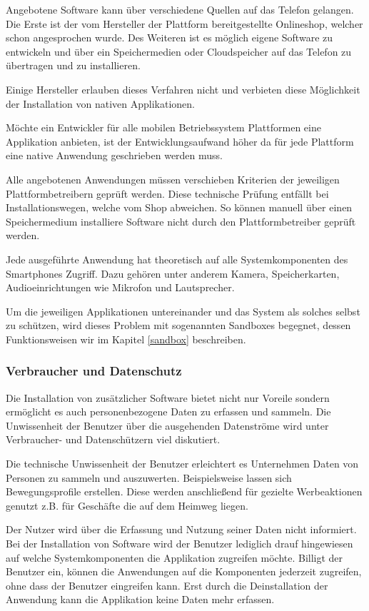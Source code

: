 Angebotene Software kann über verschiedene Quellen auf das Telefon gelangen. Die Erste ist der vom Hersteller der Plattform bereitgestellte Onlineshop, welcher schon angesprochen wurde. Des Weiteren ist es möglich eigene Software zu entwickeln und über ein Speichermedien oder Cloudspeicher auf das Telefon zu übertragen und zu installieren.

Einige Hersteller erlauben dieses Verfahren nicht und verbieten diese Möglichkeit der Installation von nativen Applikationen.

Möchte ein Entwickler für alle mobilen Betriebssystem Plattformen eine Applikation anbieten, ist der Entwicklungsaufwand höher da für jede Plattform eine native Anwendung geschrieben werden muss.

Alle angebotenen Anwendungen müssen verschieben Kriterien der jeweiligen Plattformbetreibern geprüft werden. Diese technische Prüfung entfällt bei Installationswegen, welche vom Shop abweichen. So können manuell über einen Speichermedium installiere Software nicht durch den Plattformbetreiber geprüft werden.

Jede ausgeführte Anwendung hat theoretisch auf alle Systemkomponenten des Smartphones Zugriff. Dazu gehören unter anderem Kamera, Speicherkarten, Audioeinrichtungen wie Mikrofon und Lautsprecher.

Um die jeweiligen Applikationen untereinander und das System als solches selbst zu schützen, wird dieses Problem mit sogenannten Sandboxes begegnet, dessen Funktionsweisen wir im Kapitel \ref{sandbox} beschreiben.

\subsubsection{Verbraucher und Datenschutz}
Die Installation von zusätzlicher Software bietet nicht nur Voreile sondern ermöglicht es auch personenbezogene Daten zu erfassen und sammeln. Die Unwissenheit der Benutzer über die ausgehenden Datenströme wird unter Verbraucher- und Datenschützern viel diskutiert.

Die technische Unwissenheit der Benutzer erleichtert es Unternehmen Daten von Personen zu sammeln und auszuwerten. Beispielsweise lassen sich Bewegungsprofile erstellen. Diese werden anschließend für gezielte Werbeaktionen genutzt z.B. für Geschäfte die auf dem Heimweg liegen.

Der Nutzer wird über die Erfassung und Nutzung seiner Daten nicht informiert. Bei der Installation von Software wird der Benutzer lediglich drauf hingewiesen auf welche Systemkomponenten die Applikation zugreifen möchte. Billigt der Benutzer ein, können die Anwendungen auf die Komponenten jederzeit zugreifen, ohne dass der Benutzer eingreifen kann. Erst durch die Deinstallation der Anwendung kann die Applikation keine Daten mehr erfassen.

